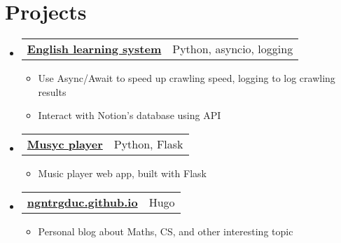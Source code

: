 \documentclass[letterpaper,11pt]{article}
\makeatletter
\newcommand{\heading}[4]{
    \normalsize
    \begin{tabular*}{0.97\textwidth}[t]{l@{\extracolsep{\fill}}r}
      \textbf{#1} & #2 \\[-2pt]
      \textit{\small#3} & \textit{\small #4}
    \end{tabular*}
    \vspace{-2pt}
}
\newcommand{\subheading}[2]{
    \normalsize
    \begin{tabular*}{0.97\textwidth}[t]{l@{\extracolsep{\fill}}r}
      \textbf{#1} & #2 \\
    \end{tabular*}
    \vspace{-2pt}
}
\makeatother
\begin{document}
\section{Projects}
    \begin{itemize}
            
        
        \item \subheading{\href{https://github.com/ngntrgduc/english-learning-system}{English learning system \faGithub}}
        {Python, asyncio, logging}
        \begin{itemize}
            \item Use Async/Await to speed up crawling speed, 
            logging to log crawling results
            \item Interact with Notion's database using API
        \end{itemize}

        \item \subheading{\href{https://github.com/ngntrgduc/musyc-player}{Musyc player \faGithub}}
        {Python, Flask}
        \begin{itemize}
            \item Music player web app, built with Flask
        \end{itemize}
        
        \item \subheading{\href{https://github.com/ngntrgduc/ngntrgduc.github.io}{ngntrgduc.github.io \faGithub}}
        {Hugo}
        \begin{itemize}
            \item Personal blog about Maths, CS, and other interesting topic
        \end{itemize}
        

\end{itemize}
\end{document}
